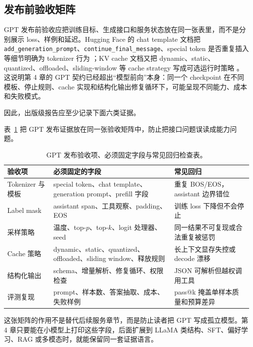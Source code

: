 \documentclass[UTF8,zihao=-4,openany]{ctexbook}
\begin{document}
\subsection{发布前验收矩阵}
GPT 发布前验收应把训练目标、生成接口和服务状态放在同一张表里，而不是分别展示 loss、样例和延迟。Hugging Face 的 chat template 文档把 \texttt{add\_generation\_prompt}、\texttt{continue\_final\_message}、special token 是否重复插入等细节明确为 tokenizer 行为 \cite{huggingface2026chattemplates}；KV cache 文档又把 dynamic、static、quantized、offloaded、sliding-window 等 cache strategy 写成可选运行时策略 \cite{huggingface2026transformerskvcache}。这说明第 4 章的 GPT 契约已经超出“模型前向”本身：同一个 checkpoint 在不同模板、停止规则、cache 实现和结构化输出修复循环下，可能呈现不同能力、成本和失败模式。

因此，出版级报告应至少记录下面六类证据。

表~\ref{tab:zh-gpt-release-matrix} 把 GPT 发布证据放在同一张验收矩阵中，防止把接口问题误读成能力问题。

\begin{table}[t]
\centering
\small
\begin{tabular}{@{}>{\raggedright\arraybackslash}p{}>{\raggedright\arraybackslash}p{}>{\raggedright\arraybackslash}p{}@{}}
\toprule
验收项 & 必须固定的字段 & 常见回归 \\
\midrule
Tokenizer 与模板 & special token、chat template、generation prompt、prefill 字段 & 重复 BOS/EOS，assistant 边界错位 \\
Label mask & assistant span、工具观察、padding、EOS & 训练 loss 下降但不会停止 \\
采样策略 & 温度、top-$p$、top-$k$、logit 处理器、seed & 同一结果不可复现或合法重复被惩罚 \\
Cache 策略 & dynamic、static、quantized、offloaded、sliding window、释放规则 & 长上下文显存失控或 decode 漂移 \\
结构化输出 & schema、增量解析、修复循环、权限检查 & JSON 可解析但越权调用工具 \\
评测复现 & prompt、样本数、答案抽取、成本、失败样例 & pass@k 掩盖单样本质量和预算差异 \\
\bottomrule
\end{tabular}
\caption{GPT 发布验收项、必须固定字段与常见回归检查表。}
\label{tab:zh-gpt-release-matrix}
\end{table}

这张矩阵的作用不是替代后续服务章节，而是防止读者把 GPT 写成孤立模型。第 4 章只要能在小模型上打印这些字段，后面扩展到 LLaMA 类结构、SFT、偏好学习、RAG 或多模态时，就能保留同一套证据语言。
\end{document}
